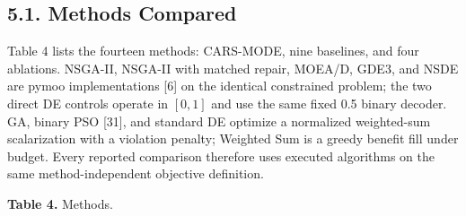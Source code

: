 \documentclass[
  10pt,
  a4paper,
]{article}
\begin{document}
\subsection{5.1. Methods Compared}\label{methods-compared}

Table 4 lists the fourteen methods: CARS-MODE, nine baselines, and four
ablations. NSGA-II, NSGA-II with matched repair, MOEA/D, GDE3, and NSDE
are pymoo implementations {[}6{]} on the identical constrained problem;
the two direct DE controls operate in \([0,1]\) and use the same fixed
0.5 binary decoder. GA, binary PSO {[}31{]}, and standard DE optimize a
normalized weighted-sum scalarization with a violation penalty; Weighted
Sum is a greedy benefit fill under budget. Every reported comparison
therefore uses executed algorithms on the same method-independent
objective definition.

\textbf{Table 4.} Methods.
\end{document}
